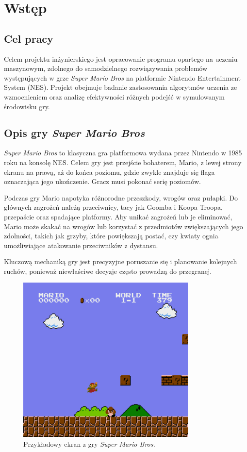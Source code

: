 \chapter{Wstęp}

\section{Cel pracy}
Celem projektu inżynierskiego jest opracowanie programu opartego na uczeniu maszynowym, zdolnego do samodzielnego rozwiązywania problemów występujących w grze \textit{Super Mario Bros} na platformie Nintendo Entertainment System (NES).
Projekt obejmuje badanie zastosowania algorytmów uczenia ze wzmocnieniem oraz analizę efektywności różnych podejść w symulowanym środowisku gry.

\section{Opis gry \textit{Super Mario Bros}}

\textit{Super Mario Bros} to klasyczna gra platformowa wydana przez Nintendo w 1985 roku na konsolę NES.
Celem gry jest przejście bohaterem, Mario, z lewej strony ekranu na prawą, aż do końca poziomu, gdzie zwykle znajduje się flaga oznaczająca jego ukończenie.
Gracz musi pokonać serię poziomów.

Podczas gry Mario napotyka różnorodne przeszkody, wrogów oraz pułapki.
Do głównych zagrożeń należą przeciwnicy, tacy jak Goomba i Koopa Troopa, przepaście oraz spadające platformy.
Aby unikać zagrożeń lub je eliminować, Mario może skakać na wrogów lub korzystać z przedmiotów zwiększających jego zdolności, takich jak grzyby, które powiększają postać, czy kwiaty ognia umożliwiające atakowanie przeciwników z dystansu.

Kluczową mechaniką gry jest precyzyjne poruszanie się i planowanie kolejnych ruchów, ponieważ niewłaściwe decyzje często prowadzą do przegranej.

\begin{figure}[h!]
	\centering
	\includegraphics[width=0.8\textwidth]{img/screenshot_mario.png}
	\caption{Przykładowy ekran z gry \textit{Super Mario Bros.}}
	\label{fig:screenshot_mario}
\end{figure}

